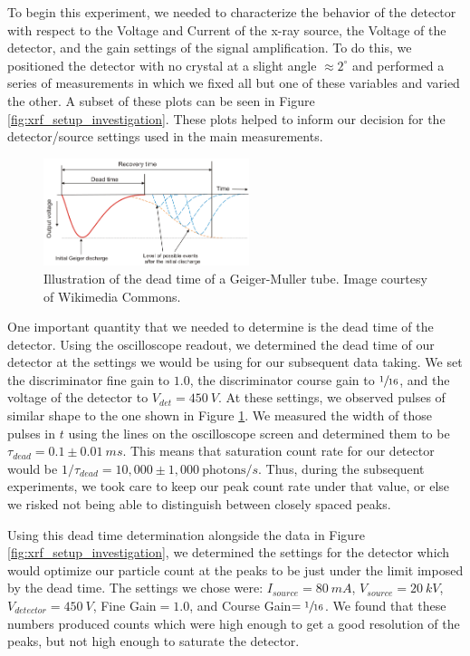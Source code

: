 \documentclass[%
 reprint,
 amsmath,amssymb,
 aps,
 pra,
]{revtex4-1}
\begin{document}
To begin this experiment, we needed to characterize the behavior of the detector with respect to the Voltage and Current of the x-ray source, the Voltage of the detector, and the gain settings of the signal amplification. To do this, we positioned the detector with no crystal at a slight angle $\approx 2^\circ$ and performed a series of measurements in which we fixed all but one of these variables and varied the other. A subset of these plots can be seen in Figure \ref{fig:xrf_setup_investigation}. These plots helped to inform our decision for the detector/source settings used in the main measurements.

\begin{figure}[H]
	\centering
	\includegraphics[width=6cm]{dead_time.png}
	\caption{Illustration of the dead time of a Geiger-Muller tube. Image courtesy of Wikimedia Commons.}
	\label{fig:dead_time}
\end{figure}

One important quantity that we needed to determine is the dead time of the detector. Using the oscilloscope readout, we determined the dead time of our detector at the settings we would be using for our subsequent data taking. We set the discriminator fine gain to $1.0$, the discriminator course gain to $\sfrac{1}{16}$, and the voltage of the detector to $V_{det} = 450~V$. At these settings, we observed pulses of similar shape to the one shown in Figure \ref{fig:dead_time}. We measured the width of those pulses in $t$ using the lines on the oscilloscope screen and determined them to be $\tau_{dead} = 0.1 \pm 0.01~ms$. This means that saturation count rate for our detector would be $1/\tau_{dead} = 10,000 \pm 1,000~\text{photons}/s$. Thus, during the subsequent experiments, we took care to keep our peak count rate under that value, or else we risked not being able to distinguish between closely spaced peaks.

Using this dead time determination alongside the data in Figure \ref{fig:xrf_setup_investigation}, we determined the settings for the detector which would optimize our particle count at the peaks to be just under the limit imposed by the dead time. The settings we chose were: $I_{source} = 80~mA$, $V_{source} = 20~kV$, $V_{detector} = 450~V$, Fine Gain$ = 1.0$, and Course Gain$ = \sfrac{1}{16}$. We found that these numbers produced counts which were high enough to get a good resolution of the peaks, but not high enough to saturate the detector.
\end{document}
